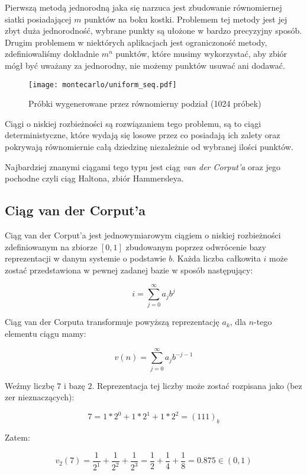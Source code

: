 \documentclass[../main.tex]{subfiles}
\begin{document}
Pierwszą metodą jednorodną jaka się narzuca jest zbudowanie równomiernej siatki
posiadającej $m$ punktów na boku kostki. Problemem tej metody jest jej zbyt
duża jednorodność, wybrane punkty są ułożone w bardzo precyzyjny sposób. Drugim
problemem w niektórych aplikacjach jest ograniczoność metody, zdefiniowaliśmy
dokładnie $m^{n}$ punktów, które musimy wykorzystać, aby zbiór mógł być uważany
za jednorodny, nie możemy punktów usuwać ani dodawać.

\begin{figure}[h]
  \centering
  \texttt{[image: montecarlo/uniform\_seq.pdf]}
  \caption{Próbki wygenerowane przez równomierny podział (1024 próbek)}
  \label{fig:UniformSamples}
\end{figure}

Ciągi o niskiej rozbieżności są rozwiązaniem tego problemu, są to ciągi
deterministyczne, które wydają się losowe przez co posiadają ich zalety oraz
pokrywają równomiernie całą dziedzinę niezależnie od wybranej ilości punktów.

Najbardziej znanymi ciągami tego typu jest ciąg \textit{van der Corput'a} oraz
jego pochodne czyli ciąg Haltona, zbiór Hammersleya.

\subsection{Ciąg van der Corput'a}

Ciąg van der Corput'a \cite{WongSamplingWH} jest jednowymiarowym ciągiem o
niskiej rozbieżności zdefiniowanym na zbiorze $[0,1]$ zbudowanym poprzez
odwrócenie bazy reprezentacji w danym systemie o podstawie $b$. Każda liczba
całkowita $i$ może zostać przedstawiona w pewnej zadanej bazie w sposób
następujący:

\[ i = \sum_{j=0}^{\infty} {a_j b^j} \]

Ciąg van der Corputa transformuje powyższą reprezentację $a_k$, dla $n$-tego
elementu ciągu mamy:

\[ v(n) = \sum_{j=0}^{\infty} {a_j b^{-j-1}} \]

\begin{example}

  Weźmy liczbę $7$ i bazę $2$. Reprezentacja tej liczby może zostać rozpisana
  jako (bez zer nieznaczących):

  \[ 7 = 1 * 2^0 + 1 * 2^1 + 1 * 2^2 = (111)_{b} \]

  \noindent Zatem:

  \[
    v_{2}(7)
      = \frac{1}{2^{1}} + \frac{1}{2^{2}} + \frac{1}{2^{3}}
      = \frac{1}{2} + \frac{1}{4} + \frac{1}{8}
      = 0.875
      \in (0,1)
  \]

\end{example}
\end{document}
